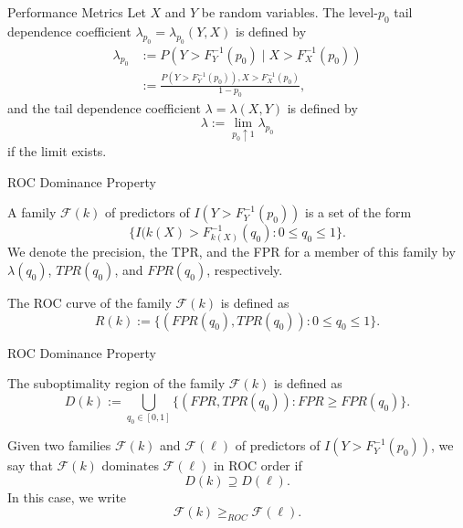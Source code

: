 \documentclass{beamer}
\begin{document}
\begin{frame}{Performance Metrics}
    Let $X$ and $Y$ be random variables. The level-$p_0$ tail dependence coefficient $\lambda_{p_0} = \lambda_{p_0}(Y, X)$ is defined by
    \begin{align*}
        \lambda_{p_0} &:= P(Y > F_Y^{-1}(p_0) \mid X > F_X^{-1}(p_0)) \\
        &:= \frac{P(Y > F_Y^{-1}(p_0)), X > F_X^{-1}(p_0)}{1 - p_0},
    \end{align*}
    and the tail dependence coefficient $\lambda = \lambda(X, Y)$ is defined by
    \[
    \lambda := \lim_{p_0 \uparrow 1} \lambda_{p_0}
    \]
    if the limit exists.
\end{frame}

\begin{frame}{ROC Dominance Property}
    \begin{definition}
        A family $\mathcal{F}(k)$ of predictors of $I(Y > F_Y^{-1}(p_0))$ is a set of the form
        \[
        \{I(k(X) > F_{k(X)}^{-1}(q_0) : 0 \le q_0 \le 1\}.
        \]
        We denote the precision, the TPR, and the FPR for a member of this family by $\lambda(q_0)$, $TPR(q_0)$, and $FPR(q_0)$, respectively.
    \end{definition}

    \begin{definition}
        The ROC curve of the family $\mathcal{F}(k)$ is defined as 
        \[
        R(k) := \{(FPR(q_0), TPR(q_0)) : 0 \le q_0 \le 1\}.
        \]
    \end{definition}    
\end{frame}

\begin{frame}{ROC Dominance Property}
    \begin{definition}    
        The suboptimality region of the family $\mathcal{F}(k)$ is defined as
        \[
        D(k) := \bigcup_{q_0 \in [0, 1]} \{(FPR, TPR(q_0)) : FPR \ge FPR(q_0)\}.
        \]
    \end{definition}
    
    \begin{definition}
        Given two families $\mathcal{F}(k)$ and $\mathcal{F}(\ell)$ of predictors of $I(Y > F_Y^{-1}(p_0))$, we say that $\mathcal{F}(k)$ dominates $\mathcal{F}(\ell)$ in ROC order if
        \[
        D(k) \supseteq D(\ell).
        \]
        In this case, we write
        \[
        \mathcal{F}(k) \ge_{ROC} \mathcal{F}(\ell).
        \]
    \end{definition}
\end{frame}
\end{document}
